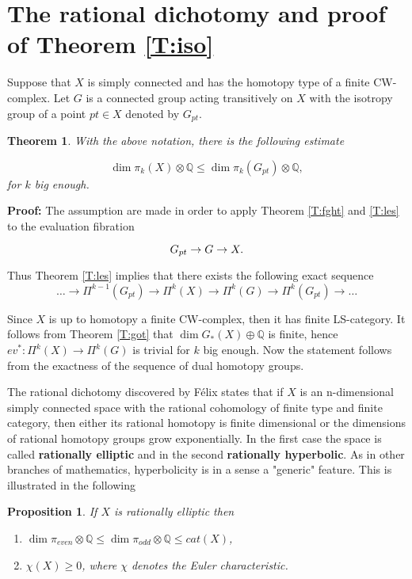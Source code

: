 \documentclass[a4paper,14pt]{article}
\newcommand{\B}[1]{\mathbb #1}
\newcommand{\qed}{\rightline {$\Box $}}
\newcommand{\BS}{{\bigskip}}
\newtheorem{thm}[theorem]{Theorem}
\newtheorem{prop}[theorem]{Proposition}
\numberwithin{equation}{section}
\numberwithin{figure}{section}
\begin{document}
\section{The rational dichotomy and proof of Theorem \ref{T:iso}}\label{S:res}





Suppose that $X$ is simply connected
and has the homotopy type of a finite CW-complex.
Let $G$ is a connected group
acting transitively on $X$ with the isotropy
group of a point $pt\in X$ denoted by $G_{pt}$.

\begin{thm}\label{T:main}
With the above notation,
there is the following estimate
 
$$\dim \pi _k(X)\otimes \B Q \leq
  \dim \pi _k(G_{pt})\otimes \B Q,$$
for $k$ big enough.
\end{thm}

\noindent
{\bf Proof:} The assumption are made in order to apply
Theorem \ref{T:fght} and \ref{T:les} to the evaluation
fibration

$$
\CD
G_{pt} \to G \to X.
\endCD
$$

\noindent
Thus Theorem \ref{T:les} implies that there exists
the following exact sequence 
$$
\dots \to \Pi^{k-1}(G_{pt}) \to \Pi^ k(X) \to \Pi ^k(G)
\to \Pi ^k(G_{pt}) \to \dots
$$

\noindent
Since $X$ is up to homotopy a finite CW-complex, then it
has finite LS-category. It follows from Theorem \ref{T:got}
that $\dim G_*(X)\oplus \B Q $ is finite, hence
$ev^*:\Pi ^k(X)\to \Pi ^k(G)$ is trivial for $k$ big enough.
Now the statement follows from the exactness of the
sequence of dual homotopy groups. 

\qed



\BS

The rational dichotomy discovered by F\'elix \cite{fe,fht}
states that if $X$ is an n-dimensional simply connected
space with the rational cohomology of finite type
and finite category, then either its rational homotopy
is finite dimensional  or the dimensions of rational
homotopy groups
grow exponentially. In the first case the space is
called {\bf rationally elliptic} and in the second 
{\bf rationally hyperbolic}. As in other branches of
mathematics, hyperbolicity is in a sense a "generic" feature.
This is illustrated in the following

\begin{prop}\label{P:ell}
If $X$ is rationally elliptic then
\begin{enumerate}
\item $\dim \pi _{even}\otimes \B Q \leq 
       \dim \pi _{odd}\otimes \B Q \leq cat(X)$,
\item $\chi(X)\geq 0$, where $\chi $ denotes the 
       Euler characteristic.\qed
\end{enumerate}
\end{prop}
\end{document}
